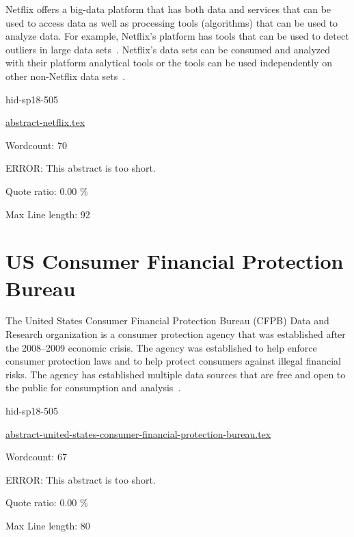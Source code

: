 Netflix offers a big-data platform that has both data and services that can be
used to access data as well as processing tools (algorithms) that can be used
to analyze data.  For example, Netflix's platform has tools that can be used to
detect outliers in large data sets~\cite{hid-sp18-505-Wong2015}.  Netflix's data sets can be
consumed and analyzed with their platform analytical tools or the tools can be
used independently on other non-Netflix data sets~\cite{hid-sp18-505-Netflix2018}.


\begin{IU}

hid-sp18-505

\href{https://github.com/cloudmesh-community/hid-sp18-505/blob/master//technology/abstract-netflix.tex}{abstract-netflix.tex}

 

Wordcount: 70

ERROR: This abstract is too short.


Quote ratio: 0.00 \%
 
Max Line length: 92
\end{IU}

\section{US Consumer Financial Protection Bureau}

The United States Consumer Financial Protection Bureau (CFPB) Data and Research
organization is a consumer protection agency that was established after the
2008--2009 economic crisis.  The agency was established to help enforce consumer
protection laws and to help protect consumers against illegal financial risks.
The agency has established multiple data sources that are free and open to the
public for consumption and analysis~\cite{hid-sp18-505-CFPB2018}.


\begin{IU}

hid-sp18-505

\href{https://github.com/cloudmesh-community/hid-sp18-505/blob/master//technology/abstract-united-states-consumer-financial-protection-bureau.tex}{abstract-united-states-consumer-financial-protection-bureau.tex}

 

Wordcount: 67

ERROR: This abstract is too short.


Quote ratio: 0.00 \%
 
Max Line length: 80
\end{IU}

